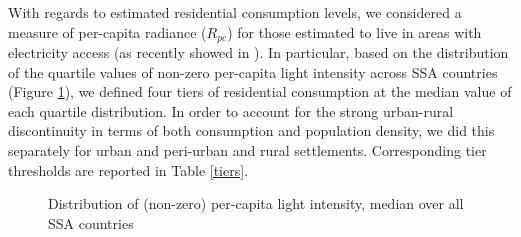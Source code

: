 \documentclass[preprint,12pt]{elsarticle}
\begin{document}
With regards to estimated residential consumption levels, we considered a measure of per-capita radiance ($R_{pc}$) for those estimated to live in areas with electricity access (as recently showed in \citep{xiao2018spatio}). In particular, based on the distribution of the quartile values of non-zero per-capita light intensity across SSA countries (Figure \ref{distribution}), we defined four tiers of residential consumption at the median value of each quartile distribution. In order to account for the strong urban-rural discontinuity in terms of both consumption and population density, we did this separately for urban and peri-urban and rural settlements. Corresponding tier thresholds are reported in Table \ref{tiers}. 

\begin{figure}[!htb]
    \centering
    \qquad
    \caption{Distribution of (non-zero) per-capita light intensity, median over all SSA countries}
    \label{distribution}
\end{figure}
\end{document}
